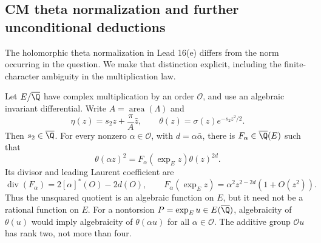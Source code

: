 \subsection{CM theta normalization and further unconditional deductions}

The holomorphic theta normalization in Lead 16(e) differs from the
norm occurring in the question. We make that distinction explicit,
including the finite-character ambiguity in the multiplication law.

\begin{proposition}\label{ari:C.7.6}
Let $E/\overline{\Q}$ have complex multiplication by an order
$\mathcal O$, and use an algebraic invariant differential. Write
$A=\operatorname{area}(\Lambda)$ and
\[
 \eta(z)=s_2z+\frac{\pi}{A}\bar z,\qquad
 \theta(z)=\sigma(z)e^{-s_2z^2/2}.
\]
Then $s_2\in\overline{\Q}$. For every nonzero
$\alpha\in\mathcal O$, with $d=\alpha\bar\alpha$, there is
$F_\alpha\in\overline{\Q}(E)$ such that
\begin{equation}\label{ari:eq:ct-CMmult}
 \theta(\alpha z)^2=F_\alpha(\exp_E z)\theta(z)^{2d}.
\end{equation}
Its divisor and leading Laurent coefficient are
\[
 \operatorname{div}(F_\alpha)=2[\alpha]^*(O)-2d(O),\qquad
 F_\alpha(\exp_Ez)=\alpha^2z^{2-2d}(1+O(z^2)).
\]
Thus the unsquared quotient is an algebraic function on $E$, but
it need not be a rational function on $E$. For a nontorsion
$P=\exp_Eu\in E(\overline{\Q})$, algebraicity of $\theta(u)$
would imply algebraicity of $\theta(\alpha u)$ for all
$\alpha\in\mathcal O$. The additive group $\mathcal O u$ has
rank two, not more than four.
\end{proposition}
